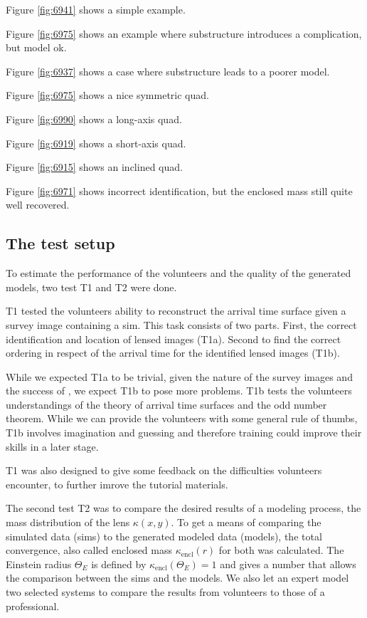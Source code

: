 Figure \ref{fig:6941} shows a simple example.

Figure \ref{fig:6975} shows an example where substructure introduces a
complication, but model ok.

Figure \ref{fig:6937} shows a case where substructure leads to a
poorer model.

Figure \ref{fig:6975} shows a nice symmetric quad.

Figure \ref{fig:6990} shows a long-axis quad.

Figure \ref{fig:6919} shows a short-axis quad.

Figure \ref{fig:6915} shows an inclined quad.

Figure \ref{fig:6971} shows incorrect identification, but the enclosed
mass still quite well recovered.


\subsection{The test setup} \label{sec:testsetup}

To estimate the performance of the volunteers and the quality of the generated models, two test T1 and T2 were done.

T1 tested the volunteers ability to reconstruct the arrival time surface given a survey image containing a sim.
This task consists of two parts.
First, the correct identification and location of lensed images (T1a).
Second to find the correct ordering in respect of the arrival time for the identified lensed images (T1b).

While we expected T1a to be trivial, given the nature of the survey images and the success of \sw, we expect T1b to pose more problems.
T1b tests the volunteers understandings of the theory of arrival time surfaces and the odd number theorem.
While we can provide the volunteers with some general rule of thumbs, T1b involves imagination and guessing and therefore training could improve their skills in a later stage.

T1 was also designed to give some feedback on the difficulties volunteers encounter, to further imrove the tutorial materials.

The second test T2 was to compare the desired results of a modeling process, the mass distribution of the lens $\kappa(x, y)$.
To get a means of comparing the simulated data (sims) to the generated modeled data (models), the total convergence, also called enclosed mass $\kappa_{\text{encl}}(r)$ for both was calculated.
The Einstein radius $\Theta_E$ is defined by $\kappa_{\text{encl}}(\Theta_E)=1$ and gives a number that allows the comparison between the sims and the models.
We also let an expert model two selected systems to compare the results from volunteers to those of a professional.

